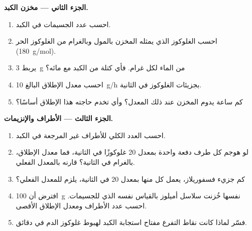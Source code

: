 \begin{problem}
\medskip
\noindent\textbf{الجزء الثاني --- مخزن الكبد.}
\begin{enumerate}[resume]
  \item احسب عدد الجسيمات في الكبد.
  \item احسب الغلوكوز الذي يمثله المخزن بالمول وبالغرام من الغلوكوز
        الحر (\qty{180}{g/mol}).
  \item يربط  \qty{3}{g} من الماء لكل غرام. فأي كتلة من
        الكبد  مع مائه؟
  \item احسب معدل الإطلاق البالغ \qty{10}{g/h} بجزيئات الغلوكوز في
        الثانية.
  \item كم ساعة يدوم المخزن عند ذلك المعدل؟ وأي  تخدم حاجته هذا
        الإطلاق أساسًا؟
\end{enumerate}

\medskip
\noindent\textbf{الجزء الثالث --- الأطراف والإنزيمات.}
\begin{enumerate}[resume]
  \item احسب العدد الكلي للأطراف غير المرجعة في الكبد.
  \item لو هوجم كل طرف دفعة واحدة بمعدل \qty{20}{} غلوكوزًا في
        الثانية، فما معدل الإطلاق، بالغرام في الثانية؟ قارنه بالمعدل
        الفعلي.
  \item كم جزيء فسفوريلاز، يعمل كل منها بمعدل \qty{20}{} في الثانية،
        يلزم للمعدل الفعلي؟
  \item افترض أن \qty{100}{g} نفسها خُزنت سلاسل أميلوز بالقياس نفسه
        الذي للجسيمات. احسب عدد الأطراف ومعدل الإطلاق الأقصى.
  \item فسّر لماذا كانت نقاط التفرع مفتاح استجابة الكبد لهبوط غلوكوز
        الدم في دقائق.
\end{enumerate}


\end{problem}
